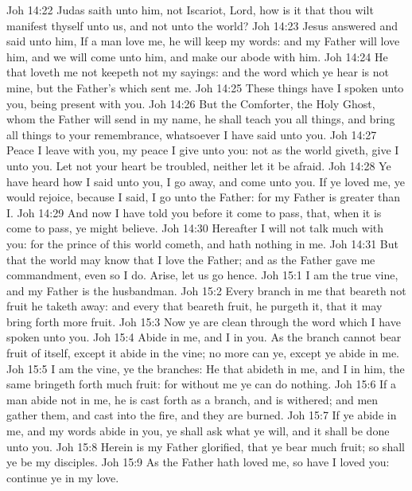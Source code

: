 \vs Joh 14:22 Judas saith unto him, not Iscariot, Lord, how is it that thou wilt manifest thyself unto us, and not unto the world?
\vs Joh 14:23 Jesus answered and said unto him, If a man love me, he will keep my words: and my Father will love him, and we will come unto him, and make our abode with him.
\vs Joh 14:24 He that loveth me not keepeth not my sayings: and the word which ye hear is not mine, but the Father's which sent me.
\vs Joh 14:25 These things have I spoken unto you, being  present with you.
\vs Joh 14:26 But the Comforter,  the Holy Ghost, whom the Father will send in my name, he shall teach you all things, and bring all things to your remembrance, whatsoever I have said unto you.
\vs Joh 14:27 Peace I leave with you, my peace I give unto you: not as the world giveth, give I unto you. Let not your heart be troubled, neither let it be afraid.
\vs Joh 14:28 Ye have heard how I said unto you, I go away, and come  unto you. If ye loved me, ye would rejoice, because I said, I go unto the Father: for my Father is greater than I.
\vs Joh 14:29 And now I have told you before it come to pass, that, when it is come to pass, ye might believe.
\vs Joh 14:30 Hereafter I will not talk much with you: for the prince of this world cometh, and hath nothing in me.
\vs Joh 14:31 But that the world may know that I love the Father; and as the Father gave me commandment, even so I do. Arise, let us go hence.
\vs Joh 15:1 I am the true vine, and my Father is the husbandman.
\vs Joh 15:2 Every branch in me that beareth not fruit he taketh away: and every  that beareth fruit, he purgeth it, that it may bring forth more fruit.
\vs Joh 15:3 Now ye are clean through the word which I have spoken unto you.
\vs Joh 15:4 Abide in me, and I in you. As the branch cannot bear fruit of itself, except it abide in the vine; no more can ye, except ye abide in me.
\vs Joh 15:5 I am the vine, ye  the branches: He that abideth in me, and I in him, the same bringeth forth much fruit: for without me ye can do nothing.
\vs Joh 15:6 If a man abide not in me, he is cast forth as a branch, and is withered; and men gather them, and cast  into the fire, and they are burned.
\vs Joh 15:7 If ye abide in me, and my words abide in you, ye shall ask what ye will, and it shall be done unto you.
\vs Joh 15:8 Herein is my Father glorified, that ye bear much fruit; so shall ye be my disciples.
\vs Joh 15:9 As the Father hath loved me, so have I loved you: continue ye in my love.
